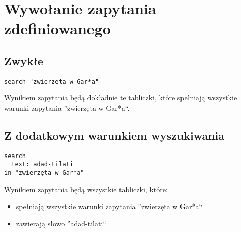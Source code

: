 \section{Wywołanie zapytania zdefiniowanego}
\subsection{Zwykłe}
\begin{verbatim}
search "zwierzęta w Gar*a"
\end{verbatim}
Wynikiem zapytania będą dokładnie te tabliczki, które spełniają wszystkie warunki zapytania ''zwierzęta w Gar*a``.
\subsection{Z dodatkowym warunkiem wyszukiwania}
\begin{verbatim}
search
  text: adad-tilati
in "zwierzęta w Gar*a"
\end{verbatim}
Wynikiem zapytania będą wszystkie tabliczki, które:
\begin{itemize}
 \item spełniają wszystkie warunki zapytania ''zwierzęta w Gar*a``
\item zawierają słowo ''adad-tilati``
\end{itemize}

